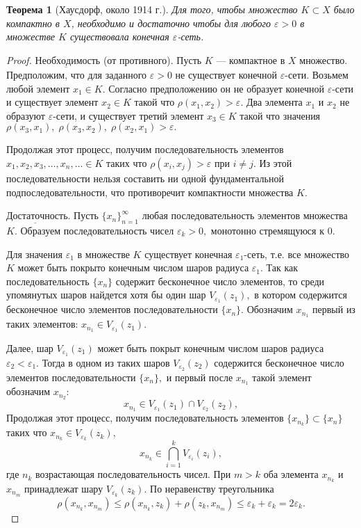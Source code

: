 \documentclass[12pt,a4paper,titlepage,oneside]{book}
\theoremstyle{definition}
\theoremstyle{plain}
\newtheorem*{theorem}{Теорема}
\theoremstyle{remark}
\theoremstyle{remark}
\theoremstyle{remark}
\theoremstyle{remark}
\theoremstyle{plain}
\theoremstyle{plain}
\begin{document}
\begin{theorem}[Хаусдорф, около 1914 г.]
Для того, чтобы множество $K \subset X$ было компактно в $X$, необходимо и достаточно чтобы для любого $\varepsilon > 0$ в множестве $K$ существовала конечная $\varepsilon$-сеть. 
\end{theorem}
\begin{proof}

$\underbar{Необходимость}$ (от противного). Пусть $K$  --- компактное в $X$ множество. Предположим, что для заданного $\varepsilon >0 $ не существует конечной $\varepsilon$-сети. Возьмем любой элемент $x_1 \in K.$ Согласно предположению он не образует конечной $\varepsilon$-сети и существует элемент $x_2 \in K$ такой что $\rho(x_1, x_2) > \varepsilon.$ Два элемента $x_1$ и $x_2$ не образуют $\varepsilon$-сети, и существует третий элемент $x_3 \in K$ такой что значения $\rho(x_3, x_1), \; \rho(x_3, x_2), \; \rho(x_2, x_1) > \varepsilon.$

Продолжая этот процесс, получим последовательность элементов $x_1,x_2,x_3, \ldots, x_n, \ldots \in K$ таких что $\rho(x_i, x_j) > \varepsilon$ при   $i \neq j$. Из этой последовательности нельзя составить ни одной фундаментальной подпоследовательности, что противоречит компактности множества $K.$

$\underbar{Достаточность}$. Пусть $\{x_n\}_{n=1}^{\infty}$ любая последовательность элементов множества $K.$ Образуем последовательность чисел $\varepsilon _k > 0,$ монотонно стремящуюся к $0.$

Для значения $\varepsilon _1$  в множестве $K$ существует конечная $\varepsilon _1$-сеть, т.е. все множество $K$ может быть покрыто конечным числом шаров радиуса $\varepsilon _1 .$ Так как последовательность $\{ x_n \}$ содержит бесконечное число элементов, то среди упомянутых шаров найдется хотя бы один шар $V_{\varepsilon _1} (z_1),$ в котором содержится бесконечное число элементов последовательности $\{x_n\}.$ Обозначим $x_{n_1}$ первый из таких элементов: $x_{n_1} \in V_{\varepsilon _1} (z_1).$

Далее, шар $ V_{\varepsilon _1} (z_1) $ может быть покрыт конечным числом шаров радиуса $\varepsilon _2 < \varepsilon _1.$ Тогда в одном из таких шаров $V_{\varepsilon _2} (z_2)$ содержится бесконечное число элементов последовательности $\{x_n\},$ и первый после $x_{n_1}$ такой элемент обозначим $x_{n_2}:$
\begin{equation*}
x_{n_1} \in V_{\varepsilon _1} (z_1) \cap V_{\varepsilon _2} (z_2),
\end{equation*}
Продолжая этот процесс, получим последовательность элементов $\{x_{n_k}\} \subset \{x_n\}$ таких что $x_{n_k} \in V_{\varepsilon _k} (z_k),$
\begin{equation*}
x_{n_k} \in \bigcap\limits_{i=1}^{k} V_{\varepsilon _i} (z_i),
\end{equation*}
где $n_k$  возрастающая последовательность чисел. При $m > k$ оба элемента $x_{n_k}$ и $x_{n_m}$ принадлежат шару $V_{\varepsilon _k} (z_k).$ По неравенству треугольника 
\begin{equation*}
\rho(x_{n_k}, x_{n_m}) \leqslant \rho(x_{n_k}, z_k) + \rho(z_k, x_{n_m}) \leqslant \varepsilon_k + \varepsilon_k = 2 \varepsilon _k.
\end{equation*}
 

\end{proof}
\end{document}
